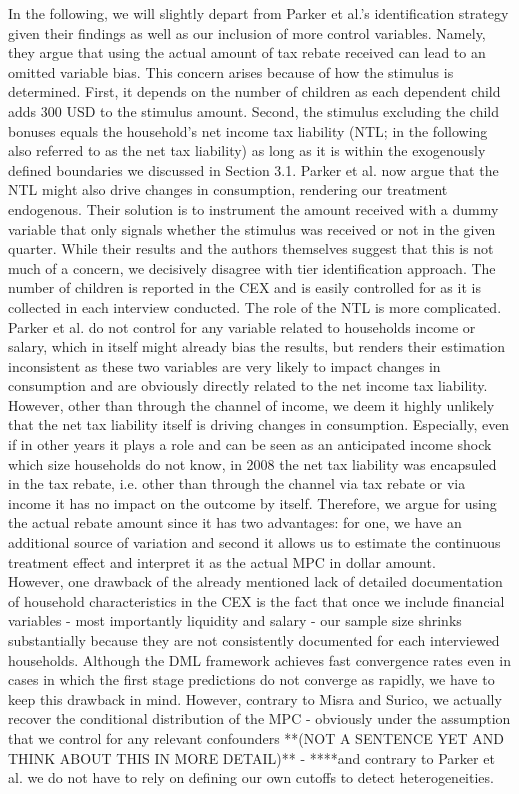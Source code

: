 In the following, we will slightly depart from Parker et al.'s identification strategy given their findings as well as our inclusion of more control variables. Namely, they argue that using the actual amount of tax rebate received can lead to an omitted variable bias. This concern arises because of how the stimulus is determined. First, it depends on the number of children as each dependent child adds 300 USD to the stimulus amount. Second, the stimulus excluding the child bonuses equals the household's net income tax liability (NTL; in the following also referred to as the net tax liability) as long as it is within the exogenously defined boundaries we discussed in Section 3.1. Parker et al. now argue that the NTL might also drive changes in consumption, rendering our treatment endogenous. Their solution is to instrument the amount received with a dummy variable that only signals whether the stimulus was received or not in the given quarter. While their results and the authors themselves suggest that this is not much of a concern, we decisively disagree with tier identification approach. The number of children is reported in the CEX and is easily controlled for as it is collected in each interview conducted. The role of the NTL is more complicated. Parker et al. do not control for any variable related to households income or salary, which in itself might already bias the results, but renders their estimation inconsistent as these two variables are very likely to impact changes in consumption and are obviously directly related to the net income tax liability. However, other than through the channel of income, we deem it highly unlikely that the net tax liability itself is driving changes in consumption. Especially, even if in other years it plays a role and can be seen as an anticipated income shock which size households do not know, in 2008 the net tax liability was encapsuled in the tax rebate, i.e. other than through the channel via tax rebate or via income it has no impact on the outcome by itself. Therefore, we argue for using the actual rebate amount since it has two advantages: for one, we have an additional source of variation and second it allows us to estimate the continuous treatment effect and interpret it as the actual MPC in dollar amount. \\
However, one drawback of the already mentioned lack of detailed documentation of household characteristics in the CEX is the fact that once we include financial variables - most importantly liquidity and salary - our sample size shrinks substantially because they are not consistently documented for each interviewed households. Although the DML framework achieves fast convergence rates even in cases in which the first stage predictions do not converge as rapidly, we have to keep this drawback in mind. However, contrary to Misra and Surico, we actually recover the conditional distribution of the MPC - obviously under the assumption that we control for any relevant confounders **(NOT A SENTENCE YET AND THINK ABOUT THIS IN MORE DETAIL)** - ****and contrary to Parker et al. we do not have to rely on defining our own cutoffs to detect heterogeneities. \\
